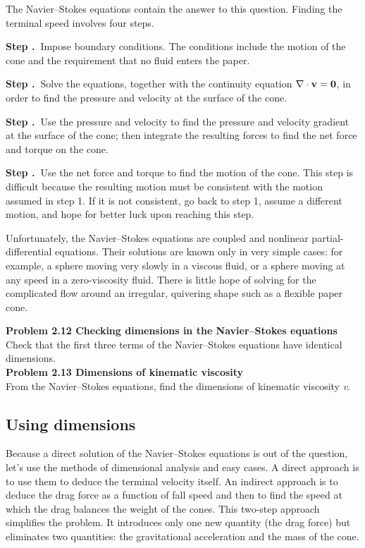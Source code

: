 \documentclass[a4paper]{book}
\begin{document}
\noindent The Navier–Stokes equations contain the answer to this question. Finding the terminal speed involves four steps.
\begin{description}
\def\MYhyp{\addtocounter{MYc}{1}\par{\bf Step .~}}
\item \MYhyp Impose boundary conditions. The conditions include the motion of the cone and the requirement that no fluid enters the paper.
\item \MYhyp Solve the equations, together with the continuity equation $\nabla \cdot \bf v = 0$, in order to find the pressure and velocity at the surface of the cone.
\item \MYhyp Use the pressure and velocity to find the pressure and velocity gradient at the surface of the cone; then integrate the resulting forces to find the net force and torque on the cone.
\item \MYhyp Use the net force and torque to find the motion of the cone. This step is difficult because the resulting motion must be consistent with the motion assumed in step 1. If it is not consistent, go back to step 1, assume a different motion, and hope for better luck upon reaching this step.
\end{description}
Unfortunately, the Navier–Stokes equations are coupled and nonlinear partial-differential equations. Their solutions are known only in very simple cases: for example, a sphere moving very slowly in a viscous fluid, or a sphere moving at any speed in a zero-viscosity fluid. There is little hope of solving for the complicated flow around an irregular, quivering shape such as a flexible paper cone.\\

\colorbox{light-gray}{
\begin{minipage}{\textwidth}
{\bf Problem 2.12 Checking dimensions in the Navier–Stokes equations}\\
Check that the first three terms of the Navier–Stokes equations have identical dimensions.\\

{\bf Problem 2.13 Dimensions of kinematic viscosity}\\
From the Navier–Stokes equations, find the dimensions of kinematic viscosity {\it v}.
\end{minipage}
}
\newpage
\subsection{Using dimensions}
Because a direct solution of the Navier–Stokes equations is out of the question, let’s use the methods of dimensional analysis and easy cases. A direct approach is to use them to deduce the terminal velocity itself. An indirect approach is to deduce the drag force as a function of fall speed and then to find the speed at which the drag balances the weight of the cones. This two-step approach simplifies the problem. It introduces only one new quantity (the drag force) but eliminates two quantities: the gravitational acceleration and the mass of the cone.\\
\end{document}
